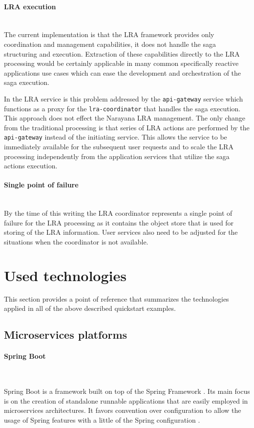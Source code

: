\documentclass[oneside,
  digital, %
  table,   %
  lof,     %
  lot,     %
]{fithesis3}
\newcommand{\newlinepar}[1]{\paragraph{#1}\needspace{4\baselineskip}\mbox{}\\}
\begin{document}
\newlinepar{LRA execution}

The current implementation is that the LRA framework provides only coordination and management capabilities, it does not handle the saga structuring and execution. Extraction of these capabilities directly to the LRA processing would be certainly applicable in many common specifically reactive applications use cases which can ease the development and orchestration of the saga execution. 

In the LRA service is this problem addressed by the \texttt{api-gateway} service which functions as a proxy for the \texttt{lra-coordinator} that handles the saga execution. This approach does not effect the Narayana LRA management. The only change from the traditional processing is that series of LRA actions are performed by the \texttt{api-gateway} instead of the initiating service. This allows the service to be immediately available for the subsequent user requests and to scale the LRA processing independently from the application services that utilize the saga actions execution.

\newlinepar{Single point of failure}

By the time of this writing the LRA coordinator represents a single point of failure for the LRA processing as it contains the object store that is used for storing of the LRA information. User services also need to be adjusted for the situations when the coordinator is not available.


\section{Used technologies}

This section provides a point of reference that summarizes the technologies applied in all of the above described quickstart examples.

\subsection{Microservices platforms}

\newlinepar{Spring Boot}
\label{sec:spring-boot}

Spring Boot is a framework built on top of the Spring Framework \cite{spring_ms}. Its main focus is on the creation of standalone runnable applications that are easily employed in microservices architectures. It favors convention over configuration to allow the usage of Spring features with a little of the Spring configuration \cite{spring_boot}.
\end{document}
